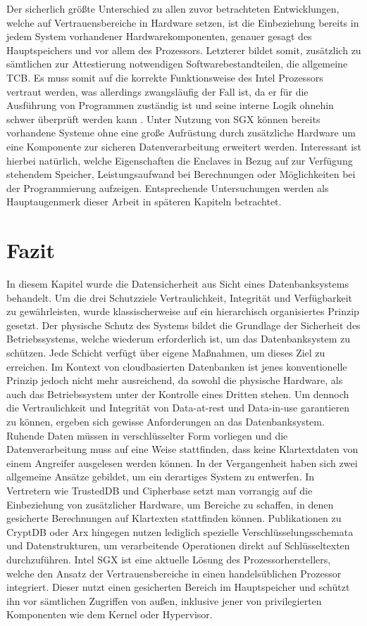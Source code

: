 Der sicherlich größte Unterschied zu allen zuvor betrachteten Entwicklungen, welche auf Vertrauensbereiche in Hardware setzen, ist die Einbeziehung bereits in jedem System vorhandener Hardwarekomponenten, genauer gesagt des Hauptspeichers und vor allem des Prozessors. Letzterer bildet somit, zusätzlich zu sämtlichen zur Attestierung notwendigen Softwarebestandteilen, die allgemeine \ac{TCB}. Es muss somit auf die korrekte Funktionsweise des Intel Prozessors vertraut werden, was allerdings zwangsläufig der Fall ist, da er für die Ausführung von Programmen zuständig ist und seine interne Logik ohnehin schwer überprüft werden kann \cite{Aumasson2016}. Unter Nutzung von \ac{SGX} können bereits vorhandene Systeme ohne eine große Aufrüstung durch zusätzliche Hardware um eine Komponente zur sicheren Datenverarbeitung erweitert werden. Interessant ist hierbei natürlich, welche Eigenschaften die Enclaves in Bezug auf zur Verfügung stehendem Speicher, Leistungsaufwand bei Berechnungen oder Möglichkeiten bei der Programmierung aufzeigen. Entsprechende Untersuchungen werden als Hauptaugenmerk dieser Arbeit in späteren Kapiteln betrachtet.

\section{Fazit}

In diesem Kapitel wurde die Datensicherheit aus Sicht eines Datenbanksystems behandelt. Um die drei Schutzziele Vertraulichkeit, Integrität und Verfügbarkeit zu gewährleisten, wurde klassischerweise auf ein hierarchisch organisiertes Prinzip gesetzt. Der physische Schutz des Systems bildet die Grundlage der Sicherheit des Betriebssystems, welche wiederum erforderlich ist, um das Datenbanksystem zu schützen. Jede Schicht verfügt über eigene Maßnahmen, um dieses Ziel zu erreichen. Im Kontext von cloudbasierten Datenbanken ist jenes konventionelle Prinzip jedoch nicht mehr ausreichend, da sowohl die physische Hardware, als auch das Betriebssystem unter der Kontrolle eines Dritten stehen. Um dennoch die Vertraulichkeit und Integrität von Data-at-rest und Data-in-use garantieren zu können, ergeben sich gewisse Anforderungen an das Datenbanksystem. Ruhende Daten müssen in verschlüsselter Form vorliegen und die Datenverarbeitung muss auf eine Weise stattfinden, dass keine Klartextdaten von einem Angreifer ausgelesen werden können. In der Vergangenheit haben sich zwei allgemeine Ansätze gebildet, um ein derartiges System zu entwerfen. In Vertretern wie TrustedDB und Cipherbase setzt man vorrangig auf die Einbeziehung von zusätzlicher Hardware, um Bereiche zu schaffen, in denen gesicherte Berechnungen auf Klartexten stattfinden können. Publikationen zu CryptDB oder Arx hingegen nutzen lediglich spezielle Verschlüsselungsschemata und Datenstrukturen, um verarbeitende Operationen direkt auf Schlüsseltexten durchzuführen. Intel \ac{SGX} ist eine aktuelle Lösung des Prozessorherstellers, welche den Ansatz der Vertrauensbereiche in einen handelsüblichen Prozessor integriert. Dieser nutzt einen gesicherten Bereich im Hauptspeicher und schützt ihn vor sämtlichen Zugriffen von außen, inklusive jener von privilegierten Komponenten wie dem Kernel oder Hypervisor.